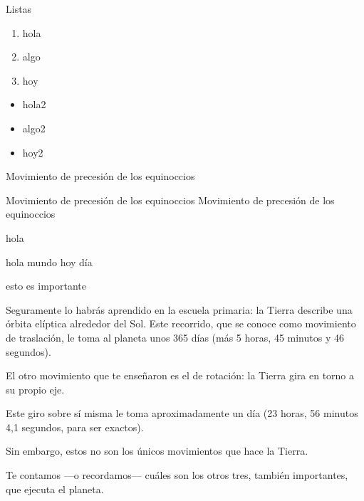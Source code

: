 \documentclass[utf8,spanish, xcolor={x11names,table},14pt, handout]{beamer}
\begin{document}
\begin{frame}{Listas}\transboxin
  \begin{enumerate}[1)]
    \item hola
    \item algo
    \item hoy
  \end{enumerate}
  
  \begin{itemize}
    \item hola2
    \item algo2
    \item hoy2
  \end{itemize}
  
  \begin{description}[MMMMMM]
    \item[casa] Movimiento de precesión de los equinoccios
    
    \item[mesa] Movimiento de precesión de los equinoccios
        Movimiento de precesión de los equinoccios
        
    \item[silla] hola
  \end{description}
\end{frame}

\begin{frame}\transglitter
  hola mundo \alert{hoy} día\newline
  
  \begin{alertenv}
    esto es importante
  \end{alertenv}
\end{frame}

\begin{frame}\transblindsvertical
\justifying
Seguramente lo habrás aprendido en la escuela primaria: la Tierra describe una órbita elíptica alrededor del Sol.
Este recorrido, que se conoce como movimiento de traslación, le toma al planeta unos 365 días
(más 5 horas, 45 minutos y 46 segundos).\newline

El otro movimiento que te enseñaron es el de rotación: la Tierra gira en torno a su propio eje.\newline

Este giro sobre sí misma le toma aproximadamente un día (23 horas, 56 minutos 4,1 segundos, para ser exactos).

Sin embargo, estos no son los únicos movimientos que hace la Tierra.

Te contamos —o recordamos— cuáles son los otros tres, también importantes, que ejecuta el planeta.
\end{frame}
\end{document}
